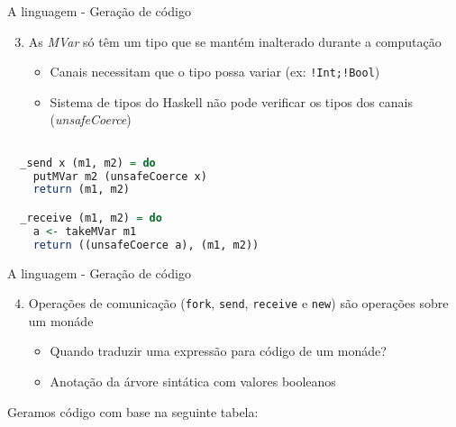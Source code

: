 \begin{frame}[fragile]{A linguagem - Geração de código}
  \begin{enumerate}
    \setcounter{enumi}{2}    
  \item As \textit{MVar} só têm um tipo que se mantém inalterado durante a computação
    \begin{itemize}
    \item Canais necessitam que o tipo possa variar (ex: \lstinline|!Int;!Bool|)
    \item Sistema de tipos do Haskell não pode verificar os tipos dos canais (\textit{unsafeCoerce})
    \end{itemize}
  \end{enumerate}
  \begin{lstlisting}[language=Haskell]

  _send x (m1, m2) = do
    putMVar m2 (unsafeCoerce x)
    return (m1, m2)

  _receive (m1, m2) = do
    a <- takeMVar m1
    return ((unsafeCoerce a), (m1, m2))
\end{lstlisting}
\end{frame}

\begin{frame}[fragile]{A linguagem - Geração de código}
  \begin{enumerate}
    \setcounter{enumi}{3}  
  \item Operações de comunicação (\lstinline|fork|, \lstinline|send|, \lstinline|receive| e \lstinline|new|) são operações sobre um monáde
    \begin{itemize}
    \item Quando traduzir uma expressão para código de um monáde?
    \item Anotação da árvore sintática com valores booleanos
    \end{itemize}
  \end{enumerate}
  Geramos código com base na seguinte tabela:
  \vskip 0.2cm
\end{frame}

